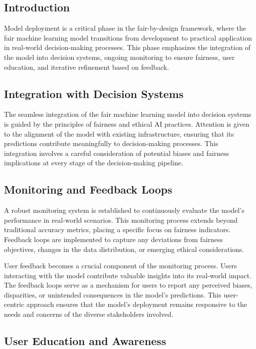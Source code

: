 \subsection{Introduction}

Model deployment is a critical phase in the fair-by-design framework, where the fair machine learning model transitions from development to practical application in real-world decision-making processes. This phase emphasizes the integration of the model into decision systems, ongoing monitoring to ensure fairness, user education, and iterative refinement based on feedback.

\subsection{Integration with Decision Systems}

The seamless integration of the fair machine learning model into decision systems is guided by the principles of fairness and ethical AI practices. Attention is given to the alignment of the model with existing infrastructure, ensuring that its predictions contribute meaningfully to decision-making processes. This integration involves a careful consideration of potential biases and fairness implications at every stage of the decision-making pipeline.

\subsection{Monitoring and Feedback Loops}

A robust monitoring system is established to continuously evaluate the model's performance in real-world scenarios. This monitoring process extends beyond traditional accuracy metrics, placing a specific focus on fairness indicators. Feedback loops are implemented to capture any deviations from fairness objectives, changes in the data distribution, or emerging ethical considerations.

User feedback becomes a crucial component of the monitoring process. Users interacting with the model contribute valuable insights into its real-world impact. The feedback loops serve as a mechanism for users to report any perceived biases, disparities, or unintended consequences in the model's predictions. This user-centric approach ensures that the model's deployment remains responsive to the needs and concerns of the diverse stakeholders involved.

\subsection{User Education and Awareness}

